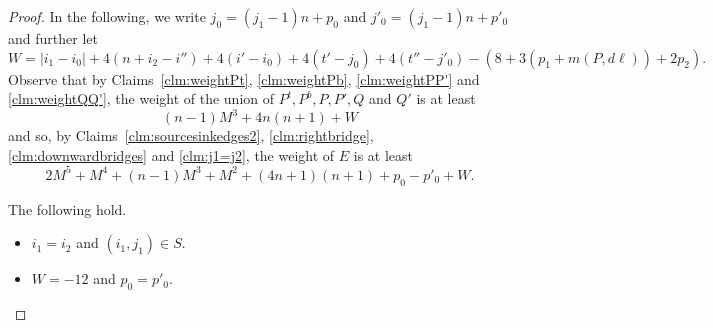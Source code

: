 \begin{proof}
\noindent
In the following, we write $j_0 = (j_1-1)n+p_0$ and $j'_0 = (j_1-1)n+p'_0$ and further let 
\[
W = |i_1-i_0| + 4(n+i_2-i'') + 4(i'-i_0) + 4(t'-j_0) + 4(t''-j'_0) - (8 + 3(p_1 + m(P,d\ell)) + 2p_2).
\]
Observe that by Claims~\ref{clm:weightPt}, \ref{clm:weightPb}, \ref{clm:weightPP'} and \ref{clm:weightQQ'}, the weight of the union of $P^t,P^b,P,P',Q$ and $Q'$ is at least
\[
(n-1)M^3 + 4n(n+1) + W
\]
and so, by Claims~\ref{clm:sourcesinkedges2}, \ref{clm:rightbridge}, \ref{clm:downwardbridges} and \ref{clm:j1=j2}, the weight of $E$ is at least
\begin{equation}
\label{eq:weightE}
2M^5 + M^4 + (n-1)M^3 + M^2 + (4n+1)(n+1) + p_0 - p'_0 + W.
\end{equation}

\begin{claim}
\label{clm:i1=i2}
The following hold.
\begin{itemize}
\item[(1)] $i_1 = i_2$ and $(i_1,j_1) \in S$. 
\item[(2)] $W=-12$ and $p_0=p'_0$.
\end{itemize}
\end{claim}


\end{proof}
